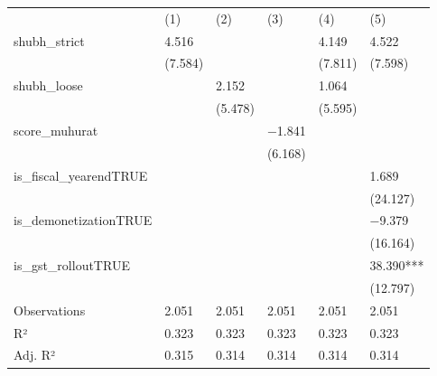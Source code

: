 \begin{tabular}{llllll}
& (1) & (2) & (3) & (4) & (5) \\
shubh\_strict & \num{4.516} &  &  & \num{4.149} & \num{4.522} \\
& (\num{7.584}) &  &  & (\num{7.811}) & (\num{7.598}) \\
shubh\_loose &  & \num{2.152} &  & \num{1.064} &  \\
&  & (\num{5.478}) &  & (\num{5.595}) &  \\
score\_muhurat &  &  & \num{-1.841} &  &  \\
&  &  & (\num{6.168}) &  &  \\
is\_fiscal\_yearendTRUE &  &  &  &  & \num{1.689} \\
&  &  &  &  & (\num{24.127}) \\
is\_demonetizationTRUE &  &  &  &  & \num{-9.379} \\
&  &  &  &  & (\num{16.164}) \\
is\_gst\_rolloutTRUE &  &  &  &  & \num{38.390}*** \\
&  &  &  &  & (\num{12.797}) \\
Observations & \num{2,051} & \num{2,051} & \num{2,051} & \num{2,051} & \num{2,051} \\
R² & \num{0.323} & \num{0.323} & \num{0.323} & \num{0.323} & \num{0.323} \\
Adj. R² & \num{0.315} & \num{0.314} & \num{0.314} & \num{0.314} & \num{0.314} \\
\end{tabular}
